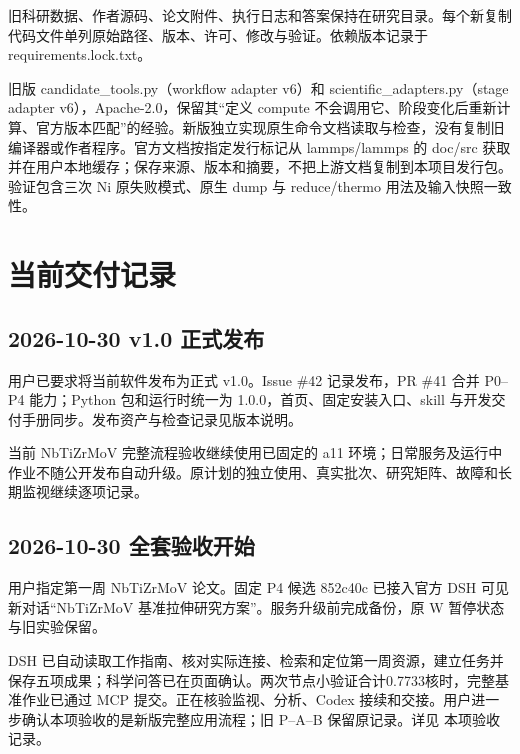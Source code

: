 \documentclass[11pt,a4paper]{ctexart}
\begin{document}
旧科研数据、作者源码、论文附件、执行日志和答案保持在研究目录。每个新复制代码文件单列原始路径、版本、许可、修改与验证。依赖版本记录于 requirements.lock.txt。



旧版 candidate\_\allowbreak{}tools.py（workflow adapter v6）和 scientific\_\allowbreak{}adapters.py（stage adapter v6），Apache-2.0，保留其“定义 compute 不会调用它、阶段变化后重新计算、官方版本匹配”的经验。新版独立实现原生命令文档读取与检查，没有复制旧编译器或作者程序。官方文档按指定发行标记从 lammps/\allowbreak{}lammps 的 doc/\allowbreak{}src 获取并在用户本地缓存；保存来源、版本和摘要，不把上游文档复制到本项目发行包。验证包含三次 Ni 原失败模式、原生 dump 与 reduce/\allowbreak{}thermo 用法及输入快照一致性。

\clearpage
\section{当前交付记录}


\subsection{2026-10-30 v1.0 正式发布}


用户已要求将当前软件发布为正式 v1.0。Issue \#42 记录发布，PR \#41 合并 P0–P4 能力；Python 包和运行时统一为 1.0.0，首页、固定安装入口、skill 与开发交付手册同步。发布资产与检查记录见版本说明。



当前 NbTiZrMoV 完整流程验收继续使用已固定的 a11 环境；日常服务及运行中作业不随公开发布自动升级。原计划的独立使用、真实批次、研究矩阵、故障和长期监视继续逐项记录。



\subsection{2026-10-30 全套验收开始}


用户指定第一周 NbTiZrMoV 论文。固定 P4 候选 852c40c 已接入官方 DSH 可见新对话“NbTiZrMoV 基准拉伸研究方案”。服务升级前完成备份，原 W 暂停状态与旧实验保留。



DSH 已自动读取工作指南、核对实际连接、检索和定位第一周资源，建立任务并保存五项成果；科学问答已在页面确认。两次节点小验证合计0.7733核时，完整基准作业已通过 MCP 提交。正在核验监视、分析、Codex 接续和交接。用户进一步确认本项验收的是新版完整应用流程；旧 P–A–B 保留原记录。详见 本项验收记录。
\end{document}
